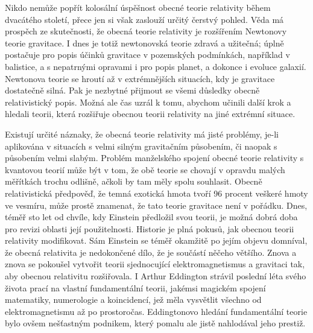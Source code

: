   Nikdo nemůže popřít kolosální úspěšnost obecné teorie relativity během dvacátého století, přece
  jen si však zaslouží určitý čerstvý pohled. Věda má prospěch ze skutečnosti, že obecná teorie
  relativity je rozšířením Newtonovy teorie gravitace. I dnes je totiž newtonovská teorie zdravá a
  užitečná; úplně postačuje pro popis účinků gravitace v pozemských podmínkách, například v
  balistice, a s nepatrnými opravami i pro popis planet, a dokonce i evoluce galaxií. Newtonova
  teorie se hroutí až v extrémnějších situacích, kdy je gravitace dostatečně silná. Pak je nezbytné
  přijmout se všemi důsledky obecně relativistický popis. Možná ale čas uzrál k tomu, abychom
  učinili další krok a hledali teorii, která rozšiřuje obecnou teorii relativity na jiné extrémní
  situace. 
  
  Existují určité náznaky, že obecná teorie relativity má jisté problémy, je-li aplikována v
  situacích s velmi silným gravitačním působením, či naopak s působením velmi slabým. Problém
  manželského spojení obecné teorie relativity s kvantovou teorií může být v tom, že obě teorie se
  chovají v opravdu malých měřítkách trochu odlišně, ačkoli by tam měly spolu souhlasit. Obecně
  relativistická předpověď, že temná exotická hmota tvoří 96 procent veškeré hmoty ve vesmíru, může
  prostě znamenat, že tato teorie gravitace není v pořádku. Dnes, téměř sto let od chvíle, kdy
  Einstein předložil svou teorii, je možná dobrá doba pro revizi oblasti její použitelnosti.
  Historie je plná pokusů, jak obecnou teorii relativity modifikovat. Sám Einstein se téměř okamžitě
  po jejím objevu domníval, že obecná relativita je nedokončené dílo, že je součástí něčeho většího.
  Znova a znova se pokoušel vytvořit teorii sjednocující elektromagnetismus a gravitaci tak, aby
  obecnou relativitu rozšiřovala. I Arthur Eddington strávil poslední léta svého života prací na
  vlastní fundamentální teorii, jakémsi magickém spojení matematiky, numerologie a koincidencí, jež
  měla vysvětlit všechno od elektromagnetismu až po prostoročas. Eddingtonovo hledání fundamentální
  teorie bylo ovšem nešťastným podnikem, který pomalu ale jistě nahlodával jeho prestiž.
  

